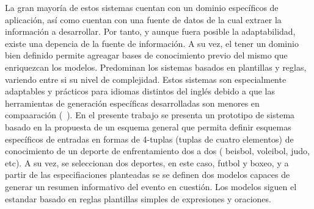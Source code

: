    La gran mayoría de estos sistemas cuentan con un dominio específicos de aplicación, así como cuentan con una fuente de datos de la 
cual extraer la información a desarrollar. Por tanto, y aunque fuera posible la adaptabilidad, existe una depencia de la fuente de información. A su vez, el tener un dominio bien definido  
permite agreagar bases de conocimiento previo del mismo que enriquezcan los modelos. Predominan los sistemas basados en plantillas y reglas, variendo entre si su nivel de complejidad. Estos 
sistemas son especialmente adaptables y prácticos para idiomas distintos del inglés debido a que las herramientas de generación específicas desarrolladas son menores en compaaración (~\cite{gunasiri2021automated}). 
    En el presente trabajo se presenta un prototipo de sistema basado en la propuesta de un esquema general que permita definir esquemas específicos de entradas en formas de 4-tuplas (tuplas de cuatro elementos) de 
conocimiento de un deporte de enfrentamiento dos a dos ( beisbol, voleibol, judo, etc). A su vez, se seleccionan dos deportes, en este caso, futbol y boxeo, y a partir de las especifiaciones planteadas se 
se definen dos modelos capaces de generar un resumen informativo del evento en cuestión. Los modelos siguen el estandar basado en reglas plantillas simples de expresiones y oraciones.
    


